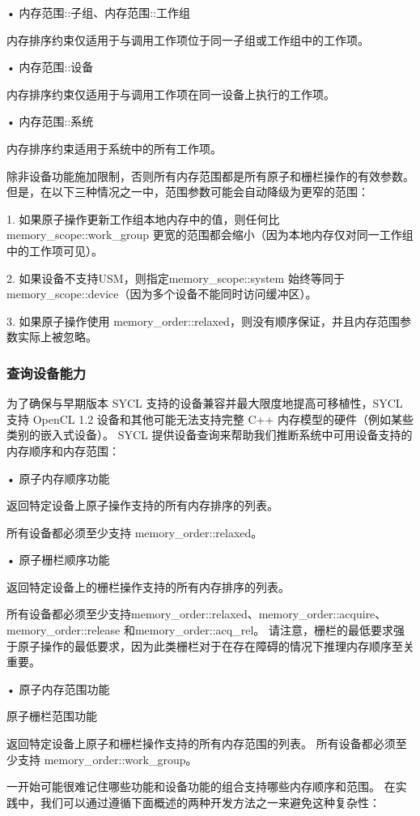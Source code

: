 • 内存范围::子组、内存范围::工作组

内存排序约束仅适用于与调用工作项位于同一子组或工作组中的工作项。

• 内存范围::设备

内存排序约束仅适用于与调用工作项在同一设备上执行的工作项。

• 内存范围::系统

内存排序约束适用于系统中的所有工作项。

除非设备功能施加限制，否则所有内存范围都是所有原子和栅栏操作的有效参数。 但是，在以下三种情况之一中，范围参数可能会自动降级为更窄的范围：

1. 如果原子操作更新工作组本地内存中的值，则任何比 memory\_scope::work\_group 更宽的范围都会缩小（因为本地内存仅对同一工作组中的工作项可见）。

2. 如果设备不支持USM，则指定memory\_scope::system 始终等同于memory\_scope::device（因为多个设备不能同时访问缓冲区）。

3. 如果原子操作使用 memory\_order::relaxed，则没有顺序保证，并且内存范围参数实际上被忽略。

\subsubsection{查询设备能力}
为了确保与早期版本 SYCL 支持的设备兼容并最大限度地提高可移植性，SYCL 支持 OpenCL 1.2 设备和其他可能无法支持完整 C++ 内存模型的硬件（例如某些类别的嵌入式设备）。 SYCL 提供设备查询来帮助我们推断系统中可用设备支持的内存顺序和内存范围：

• 原子内存顺序功能

返回特定设备上原子操作支持的所有内存排序的列表。

所有设备都必须至少支持 memory\_order::relaxed。

• 原子栅栏顺序功能

返回特定设备上的栅栏操作支持的所有内存排序的列表。

所有设备都必须至少支持memory\_order::relaxed、memory\_order::acquire、memory\_order::release 和memory\_order::acq\_rel。 请注意，栅栏的最低要求强于原子操作的最低要求，因为此类栅栏对于在存在障碍的情况下推理内存顺序至关重要。

• 原子内存范围功能

原子栅栏范围功能

返回特定设备上原子和栅栏操作支持的所有内存范围的列表。 所有设备都必须至少支持 memory\_order::work\_group。

一开始可能很难记住哪些功能和设备功能的组合支持哪些内存顺序和范围。 在实践中，我们可以通过遵循下面概述的两种开发方法之一来避免这种复杂性：

